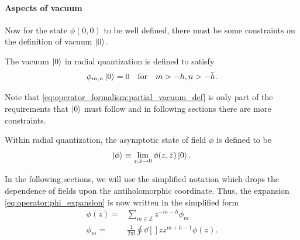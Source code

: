 \documentclass[10pt]{article}
\newcommand{\ii}{\mathrm{i}}
\begin{document}
\paragraph{Aspects of vacuum}
Now for the state $\phi(0,0)$ to be well defined, there must be some constraints on the definition of vacuum $\ket{0}$.
\begin{property}
    The vacuum $\ket{0}$ in radial quantization is defined to satisfy
    \begin{equation}
        \phi_{m,n}\ket{0}=0\qfor m>-h,n>-\bar{h}.\label{eq:operator_formalism:partial_vacuum_def}
    \end{equation}
\end{property}
\begin{remark}
    Note that \cref{eq:operator_formalism:partial_vacuum_def} is only part of the requirements that $\ket{0}$ must follow and in following sections there are more constraints.
\end{remark}
\begin{definition}
    Within radial quantization, the asymptotic state of field $\phi$ is defined to be 
    \begin{equation}
        \ket{\phi}\equiv\lim_{z,\bar{z}\to0}\phi(z,\bar{z})\ket{0}.
    \end{equation}
\end{definition}
In the following sections, we will use the simplified notation which drops the dependence of fields upon the antiholomorphic coordinate.
Thus, the expansion \cref{eq:operator:phi_expansion} is now written in the simplified form
\begin{subequations}
    \begin{align}
        \phi(z)= & \sum_{m\in\mathbb{Z}}z^{-m-h}\phi_m             \\
        \phi_m=  & \frac{1}{2\pi\ii}\oint\dd[]{z}z^{m+h-1}\phi(z).
    \end{align}
\end{subequations}
\end{document}
